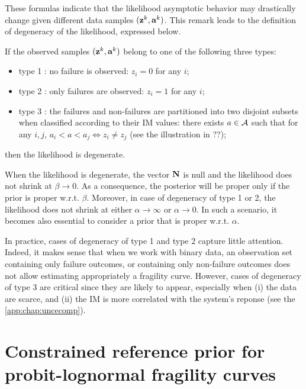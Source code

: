 %
These formulas indicate that the likelihood asymptotic behavior may drastically change given different data samples $(\mathbf{z}^k,\mathbf{a}^k)$.
This remark leads to the definition of degeneracy of the likelihood, expressed below.


\begin{defi}\label{def:constr-frag:degeneracy}
    If the observed samples $(\mathbf{z}^k,\mathbf{a}^k)$ belong to one of the following three types:
    \begin{itemize}
        \item
        type 1 : no failure is observed: $z_i=0$ for any $i$;
        \item type 2 : only failures are observed: $z_i=1$ for any $i$;
        \item type 3 : the failures and non-failures are partitioned into two disjoint subsets when classified according to their IM values:
        there exists $a\in\mathcal{A}$ such that for any $i,j$, $a_i<a<a_j\Longleftrightarrow z_i\ne z_j$ (see the illustration in ??);
    \end{itemize}
    then the likelihood is degenerate.
\end{defi}

When the likelihood is degenerate, the vector $\mathbf{N}$ is null and the likelihood does not shrink at $\beta\to0$.
As a consequence, the posterior will be proper only if the prior is proper w.r.t. $\beta$.
Moreover, in case of degeneracy of type 1 or 2, the likelihood does not shrink at either $\alpha\to\infty$ or $\alpha\to0$. In such a scenario, it becomes also essential to consider a prior that is proper  w.r.t. $\alpha$.

In practice, cases of degeneracy of type 1 and type 2 capture little attention. 
Indeed, it makes sense that when we work with binary data, an observation set containing only failure outcomes, or containing only non-failure outcomes does not allow estimating appropriately a fragility curve.
However, cases of degeneracy of type 3 are critical since they are likely to appear, especially when (i) the data are scarce, and (ii) the IM is more correlated with the system's reponse (see the \cref{app:chap:uncecomp}).


\section{Constrained reference prior for probit-lognormal fragility curves}



